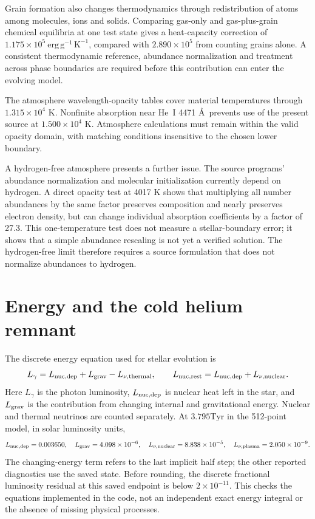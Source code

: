 \documentclass[11pt,letterpaper]{article}
\newcommand{\Tyr}{\mathrm{Tyr}}
\begin{document}
Grain formation also changes thermodynamics through redistribution of atoms
among molecules, ions and solids. Comparing gas-only and gas-plus-grain
chemical equilibria at one test state gives a heat-capacity correction of
$1.175\times10^5\ \mathrm{erg\,g^{-1}\,K^{-1}}$, compared with
$2.890\times10^5$ from counting grains alone. A consistent thermodynamic
reference, abundance normalization and treatment across phase boundaries are
required before this contribution can enter the evolving model.

The atmosphere wavelength-opacity tables cover material temperatures through
$1.315\times10^4$ K. Nonfinite absorption near He~I 4471 \AA\ prevents use
of the present source at $1.500\times10^4$ K. Atmosphere calculations must
remain within the valid opacity domain, with matching conditions insensitive
to the chosen lower boundary.

A hydrogen-free atmosphere presents a further issue. The source programs'
abundance normalization and molecular initialization currently depend on
hydrogen. A direct opacity test at 4017 K shows that multiplying all number
abundances by the same factor preserves composition and nearly preserves
electron density, but can change individual absorption coefficients by a
factor of 27.3. This one-temperature test does not measure a stellar-boundary
error; it shows that a simple abundance rescaling is not yet a verified solution.
The hydrogen-free limit therefore requires a source formulation that does not
normalize abundances to hydrogen.

\section{Energy and the cold helium remnant}
The discrete energy equation used for stellar evolution is
\[
 L_\gamma=L_{\rm nuc,dep}+L_{\rm grav}-L_{\nu,\rm thermal},\qquad
 L_{\rm nuc,rest}=L_{\rm nuc,dep}+L_{\nu,\rm nuclear}.
\]
Here $L_\gamma$ is the photon luminosity, $L_{\rm nuc,dep}$ is nuclear heat
left in the star, and $L_{\rm grav}$ is the contribution from changing internal
and gravitational energy. Nuclear and thermal neutrinos are counted separately.
At $3.795\Tyr$ in the 512-point model, in solar luminosity units,
\[
 L_{\rm nuc,dep}=0.003650,\quad
 L_{\rm grav}=4.098\times10^{-6},\quad
 L_{\nu,\rm nuclear}=8.838\times10^{-5},\quad
 L_{\nu,\rm plasma}=2.050\times10^{-9}.
\]
The changing-energy term refers to the last implicit half step; the other
reported diagnostics use the saved state. Before rounding, the discrete
fractional luminosity residual at this saved endpoint is below $2\times10^{-11}$. This checks the equations implemented
in the code, not an independent exact energy integral or the absence of
missing physical processes.
\end{document}
